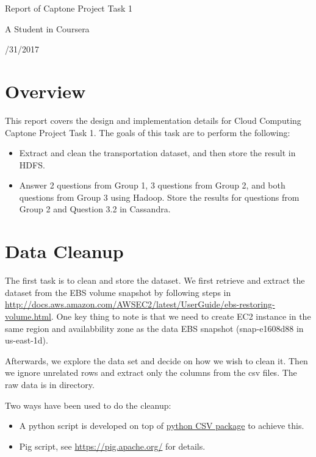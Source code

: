 \documentclass[fontsize=11pt,paper=a4,pagesize=auto]{scrbook}
\begin{document}
\begin{titlepage}
  \vspace*{1cm}
  {\huge\raggedright Report of Captone Project Task 1\par}
  \noindent\hrulefill\par
  {\LARGE\raggedleft A Student in Coursera\par}
  \vfill
  {\Large{}/31/2017\par}
\end{titlepage}



\section{Overview}
This report covers the design and implementation details for Cloud Computing Captone Project Task 1. The goals of this task are to perform the following:
\begin{itemize}
\item Extract and clean the transportation dataset, and then store the result in HDFS.
\item Answer 2 questions from Group 1, 3 questions from Group 2, and both questions from Group 3 using Hadoop. Store the results for questions from Group 2 and Question 3.2 in Cassandra.   
\end{itemize}
 
\section{Data Cleanup}
\par The first task is to clean and store the dataset. We  first retrieve and extract the dataset from the EBS volume snapshot by following steps in \url{http://docs.aws.amazon.com/AWSEC2/latest/UserGuide/ebs-restoring-volume.html}. One key thing to note is that we need to create EC2 instance in the same region and availabbility zone as the data EBS snapshot (snap-e1608d88 in us-east-1d).   
\par Afterwards, we explore the data set and decide on how we wish to clean it. Then we ignore unrelated rows and extract only the columns from the csv files. The raw data is in 
directory. 
\par Two ways have been used to do the cleanup: 
\begin{itemize} 
\item A python script is developed on top of \href{https://docs.python.org/2/library/csv.html}{python CSV package} to achieve this. 
\item Pig script, see \url{https://pig.apache.org/} for details. 
\end{itemize}
\end{document}
